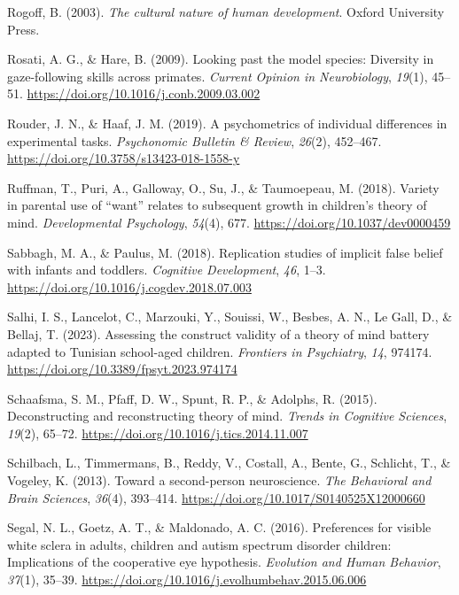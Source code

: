 \documentclass[
]{scrbook}
\newlength{\cslhangindent}
\newenvironment{CSLReferences}[2] %
 {\begin{list}{}{%
  \setlength{\itemindent}{0pt}
  \setlength{\leftmargin}{0pt}
  \setlength{\parsep}{0pt}
  \ifodd #1
   \setlength{\leftmargin}{\cslhangindent}
   \setlength{\itemindent}{-1\cslhangindent}
  \fi
  \setlength{\itemsep}{#2\baselineskip}}}
 {\end{list}}
\begin{document}
\begin{CSLReferences}{1}{0}
Rogoff, B. (2003). \emph{The cultural nature of human development}. Oxford University Press.

Rosati, A. G., \& Hare, B. (2009). Looking past the model species: Diversity in gaze-following skills across primates. \emph{Current Opinion in Neurobiology}, \emph{19}(1), 45--51. \url{https://doi.org/10.1016/j.conb.2009.03.002}

Rouder, J. N., \& Haaf, J. M. (2019). A psychometrics of individual differences in experimental tasks. \emph{Psychonomic Bulletin \& Review}, \emph{26}(2), 452--467. \url{https://doi.org/10.3758/s13423-018-1558-y}

Ruffman, T., Puri, A., Galloway, O., Su, J., \& Taumoepeau, M. (2018). Variety in parental use of {``want''} relates to subsequent growth in children's theory of mind. \emph{Developmental Psychology}, \emph{54}(4), 677. \url{https://doi.org/10.1037/dev0000459}

Sabbagh, M. A., \& Paulus, M. (2018). Replication studies of implicit false belief with infants and toddlers. \emph{Cognitive Development}, \emph{46}, 1--3. \url{https://doi.org/10.1016/j.cogdev.2018.07.003}

Salhi, I. S., Lancelot, C., Marzouki, Y., Souissi, W., Besbes, A. N., Le Gall, D., \& Bellaj, T. (2023). Assessing the construct validity of a theory of mind battery adapted to {Tunisian} school-aged children. \emph{Frontiers in Psychiatry}, \emph{14}, 974174. \url{https://doi.org/10.3389/fpsyt.2023.974174}

Schaafsma, S. M., Pfaff, D. W., Spunt, R. P., \& Adolphs, R. (2015). Deconstructing and reconstructing theory of mind. \emph{Trends in Cognitive Sciences}, \emph{19}(2), 65--72. \url{https://doi.org/10.1016/j.tics.2014.11.007}

Schilbach, L., Timmermans, B., Reddy, V., Costall, A., Bente, G., Schlicht, T., \& Vogeley, K. (2013). Toward a second-person neuroscience. \emph{The Behavioral and Brain Sciences}, \emph{36}(4), 393--414. \url{https://doi.org/10.1017/S0140525X12000660}

Segal, N. L., Goetz, A. T., \& Maldonado, A. C. (2016). Preferences for visible white sclera in adults, children and autism spectrum disorder children: Implications of the cooperative eye hypothesis. \emph{Evolution and Human Behavior}, \emph{37}(1), 35--39. \url{https://doi.org/10.1016/j.evolhumbehav.2015.06.006}


\end{CSLReferences}
\end{document}
